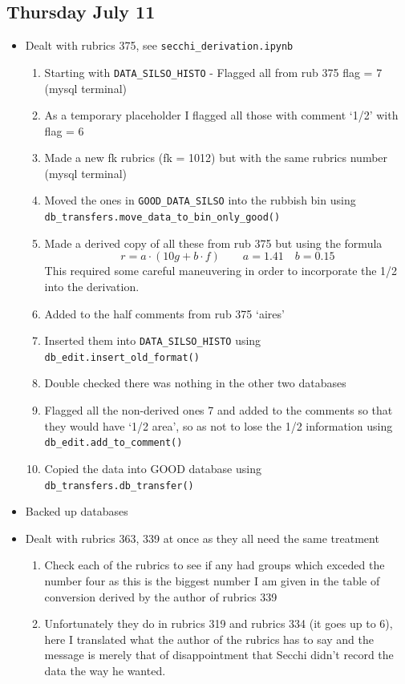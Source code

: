 \documentclass[12pt]{article}
\begin{document}
\subsection{Thursday July 11}
\begin{itemize}
    \item Dealt with rubrics 375, see \texttt{secchi\_derivation.ipynb}
    \begin{enumerate}
        \item Starting with \texttt{DATA\_SILSO\_HISTO} - Flagged all from rub 375 flag = 7 (mysql terminal)
        \item As a temporary placeholder I flagged all those with comment `1/2' with flag = 6 
        \item Made a new fk rubrics (fk = 1012) but with the same rubrics number (mysql terminal)
        \item Moved the ones in \texttt{GOOD\_DATA\_SILSO} into the rubbish bin using \texttt{db\_transfers.move\_data\_to\_bin\_only\_good()} 
        \item Made a derived copy of all these from rub 375 but using the formula $$r = a\cdot(10g+b\cdot f)\quad\quad a=1.41\quad b=0.15$$This required some careful maneuvering in order to incorporate the 1/2 into the derivation.
        \item Added to the half comments from rub 375 `aires'
        \item Inserted them into \texttt{DATA\_SILSO\_HISTO} using \texttt{db\_edit.insert\_old\_format()}
        \item Double checked there was nothing in the other two databases
        \item Flagged all the non-derived ones 7 and added to the comments so that they would have `1/2 area', so as not to lose the 1/2 information using \texttt{db\_edit.add\_to\_comment()}
        \item Copied the data into GOOD database using \texttt{db\_transfers.db\_transfer()}
    \end{enumerate}
    \item Backed up databases
    \item Dealt with rubrics 363, 339 at once as they all need the same treatment
    \begin{enumerate}
        \item Check each of the rubrics to see if any had groups which exceded the number four as this is the biggest number I am given in the table of conversion derived by the author of rubrics 339
        \item Unfortunately they do in rubrics 319 and rubrics 334 (it goes up to 6), here I translated what the author of the rubrics has to say and the message is merely that of disappointment that Secchi didn't record the data the way he wanted.

\end{enumerate}
\end{itemize}
\end{document}
